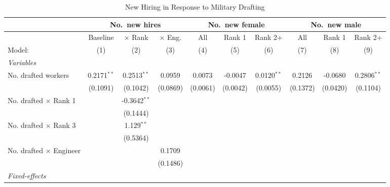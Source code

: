 \begin{table}[htbp]
\centering
\caption{New Hiring in Response to Military Drafting}
\label{tab:reallocation-newhires}
\scriptsize
\begin{threeparttable}
\begin{tabular}{lccccccccc}
   \tabularnewline \midrule \midrule
 & \multicolumn{3}{c}{No.\ new hires} & \multicolumn{3}{c}{No.\ new female} & \multicolumn{3}{c}{No.\ new male} \\
\midrule
                                  & Baseline      & $\times$ Rank  & $\times$ Eng.  & All      & Rank 1   & Rank 2+       & All      & Rank 1   & Rank 2+ \\   
   Model:                         & (1)           & (2)            & (3)            & (4)      & (5)      & (6)           & (7)      & (8)      & (9)\\  
   \midrule
   \emph{Variables}\\
   No. drafted workers            & 0.2171$^{**}$ & 0.2513$^{**}$  & 0.0959         & 0.0073   & -0.0047  & 0.0120$^{**}$ & 0.2126   & -0.0680  & 0.2806$^{**}$\\   
                                  & (0.1091)      & (0.1042)       & (0.0869)       & (0.0061) & (0.0042) & (0.0055)      & (0.1372) & (0.0420) & (0.1104)\\   
   No. drafted $\times$ Rank 1    &               & -0.3642$^{**}$ &                &          &          &               &          &          &   \\   
                                  &               & (0.1444)       &                &          &          &               &          &          &   \\   
   No. drafted $\times$ Rank 3    &               & 1.129$^{**}$   &                &          &          &               &          &          &   \\   
                                  &               & (0.5364)       &                &          &          &               &          &          &   \\   
   No. drafted $\times$ Engineer  &               &                & 0.1709         &          &          &               &          &          &   \\   
                                  &               &                & (0.1486)       &          &          &               &          &          &   \\   
   \midrule
   \emph{Fixed-effects}\\

\end{tabular}
\end{threeparttable}
\end{table}
